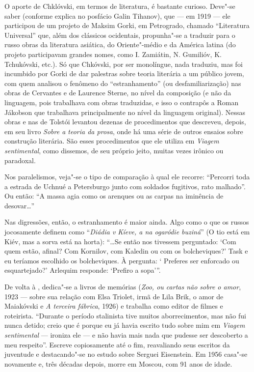 O aporte de Chklóvski, em termos de literatura, é bastante curioso.
Deve"-se saber (conforme explica no posfácio Galin Tihanov), que --- em
1919 --- ele participou de um projeto de Maksim Gorki, em Petrogrado,
chamado ``Literatura Universal'' que, além dos clássicos ocidentais,
propunha"-se a traduzir para o russo obras da literatura asiática, do
Oriente"-médio e da América latina (do projeto participavam grandes
nomes, como I. Zamiátin, N. Gumilióv, K. Tchukóvski, etc.). Só que
Chkóvski, por ser monolíngue, nada traduziu, mas foi incumbido por Gorki
de dar palestras sobre teoria literária a um público jovem, com quem
analisou o fenômeno do ``estranhamento'' (ou desfamiliarização) nas
obras de Cervantes e de Laurence Sterne, no nível da composição (e não
da linguagem, pois trabalhava com obras traduzidas, e isso o contrapôs a
Roman Jákobson que trabalhava principalmente no nível da linguagem
original). Nessas obras e nas de Tolstói levantou dezenas de
procedimentos que descreveu, depois, em seu livro \emph{Sobre a teoria
da prosa}, onde há uma série de outros ensaios sobre construção
literária. São esses procedimentos que ele utiliza em \emph{Viagem
sentimental}, como dissemos, de seu próprio jeito, muitas vezes irônico
ou paradoxal.

Nos paralelismos, veja"-se o tipo de comparação à qual ele recorre:
``Percorri toda a estrada de Uchnué a Petersburgo junto com soldados
fugitivos, rato malhado''. Ou então: ``A massa agia como os arenques ou
as carpas na iminência de desovar\ldots{}''

Nas digressões, então, o estranhamento é maior ainda. Algo como o que os
russos jocosamente definem como ``\emph{Diádia v Kíeve, a na ogaródie
buziná}'' (O tio está em Kiév, mas a sorva está na horta): ``\ldots{}Se então
nos tivessem perguntado: `Com quem estão, afinal? Com Kornilov, com
Kaledin ou com os bolcheviques?' Task e eu teríamos escolhido os
bolcheviques. À pergunta: ` Preferes ser enforcado ou esquartejado?'
Arlequim responde: `Prefiro a sopa'''.

De volta à , dedica"-se a livros de memórias (\emph{Zoo, ou cartas
não sobre o amor}, 1923 --- sobre sua relação com Elsa Triolet, irmã de
Lila Brik, o amor de Maiakóvski e \emph{A terceira fábrica}, 1926) e
trabalha como editor de filmes e roteirista. ``Durante o período
stalinista tive muitos aborrecimentos, mas não fui nunca detido; creio
que é porque eu já havia escrito tudo sobre mim em \emph{Viagem
sentimental} --- ironiza ele --- e não havia mais nada que pudesse ser
descoberto a meu respeito''. Escreve copiosamente até o fim,
reavaliando seus escritos da juventude e destacando"-se no estudo sobre
Serguei Eisenstein. Em 1956 casa"-se novamente e, três décadas depois,
morre em Moscou, com 91 anos de idade.

